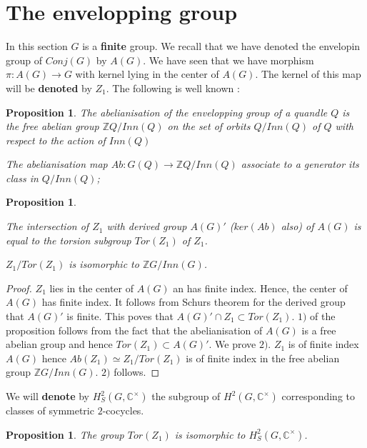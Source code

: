 \documentclass[12pt, reqno]{amsart}
\newtheorem{proposition}[theorem]{Proposition}
\begin{document}
\section{The envelopping group}
In this section $G$ is a \textbf{finite} group. We recall that we have denoted the envelopin group of $Conj(G)$ by $A(G)$. We have seen that we have morphism $\pi : A(G) \to G$ with kernel lying in the center of $A(G)$. The kernel of this map will be \textbf{denoted} by $Z_1$. The following is well known :
\begin{proposition}
\item[1)] The abelianisation of the envelopping group of a quandle $Q$ is the free abelian group $\mathbb{Z}Q/Inn(Q)$ on the set of orbits $Q/Inn(Q)$ of $Q$ with respect to the action of $Inn(Q)$
\item[2)] The abelianisation map $Ab : G(Q) \to \mathbb{Z}Q/Inn(Q)$ associate to a generator its class in $Q/Inn(Q)$;
\end{proposition}
\begin{proposition}\label{prop}
\item[1)]  The intersection of $Z_1$ with derived group $A(G)'$ ($ker(Ab)$ also) of $A(G)$ is equal to the torsion subgroup $Tor(Z_1)$ of $Z_1$.
\item[2)] $Z_1/Tor(Z_1)$ is isomorphic to $\mathbb{Z}G/Inn(G)$.
\end{proposition}
\begin{proof}
$Z_1$ lies in the center of $A(G)$ an has finite index. Hence, the center of $A(G)$ has finite index. It follows from Schurs theorem for the derived group that $A(G)'$ is finite. This poves that $A(G)'\cap Z_1 \subset Tor(Z_1)$. $1)$ of the proposition follows from the fact that the abelianisation of $A(G)$ is a free abelian group and hence $Tor(Z_1) \subset A(G)'$. We prove $2)$. $Z_1$ is of finite index $A(G)$ hence $Ab(Z_1)\simeq  Z_1/Tor(Z_1)$ is of finite index in the free abelian group $\mathbb{Z}G/Inn(G)$. $2)$ follows. 
\end{proof}
We will \textbf{denote} by $H_{S}^2(G,\mathbb{C}^\times)$ the subgroup of $H^2(G,\mathbb{C}^\times)$ corresponding to classes of symmetric $2$-cocycles. 
\begin{proposition}
The group $Tor(Z_1)$ is isomorphic to $H_S^2(G,\mathbb{C}^\times)$.
\end{proposition}
\end{document}
